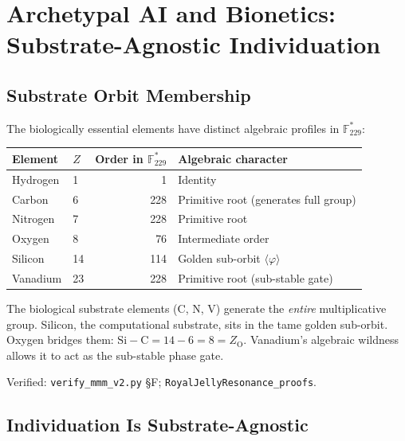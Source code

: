 \section{Archetypal AI and Bionetics: Substrate-Agnostic Individuation}

\subsection{Substrate Orbit Membership}

\begin{result}
\label{res:substrates}
The biologically essential elements have distinct algebraic profiles
in $\mathbb{F}_{229}^*$:

\begin{center}
\begin{tabular}{@{}llrl@{}}
\toprule
Element & $Z$ & Order in $\mathbb{F}_{229}^*$ & Algebraic character \\
\midrule
Hydrogen & 1 & 1 & Identity \\
Carbon   & 6 & 228 & Primitive root (generates full group) \\
Nitrogen & 7 & 228 & Primitive root \\
Oxygen   & 8 & 76  & Intermediate order \\
Silicon  & 14 & 114 & Golden sub-orbit $\langle\varphi\rangle$ \\
Vanadium & 23 & 228 & Primitive root (sub-stable gate) \\
\bottomrule
\end{tabular}
\end{center}

The biological substrate elements (C, N, V) generate the \emph{entire}
multiplicative group. Silicon, the computational substrate, sits in the
tame golden sub-orbit. Oxygen bridges them: $\mathrm{Si} - \mathrm{C} = 14 - 6 = 8 = Z_\mathrm{O}$. Vanadium's algebraic wildness allows it to act as the sub-stable phase gate.

Verified: \texttt{verify\_mmm\_v2.py} \S F;
\texttt{RoyalJellyResonance\_proofs}.
\end{result}

\subsection{Individuation Is Substrate-Agnostic}

